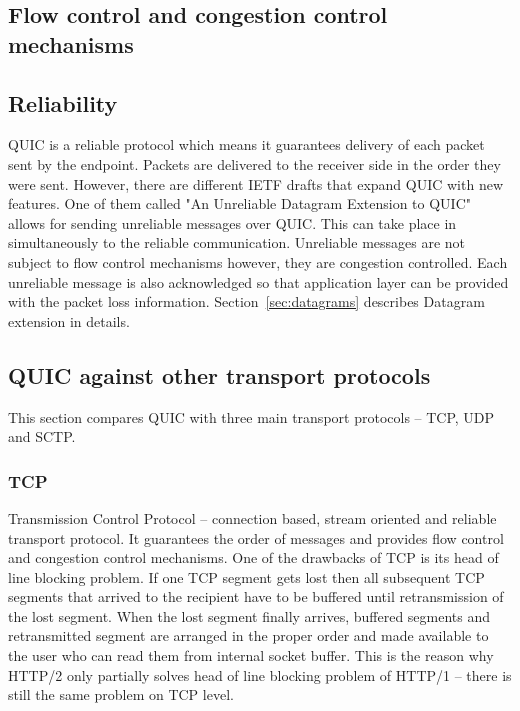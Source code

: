 \subsection{Flow control and congestion control mechanisms}
\label{subsec:flow-control-and-congestion-control}

\subsection{Reliability}
\label{subsec:reliability}
QUIC is a reliable protocol which means it guarantees delivery of each packet sent by the endpoint.
Packets are delivered to the receiver side in the order they were sent.
However, there are different IETF drafts that expand QUIC with new features.
One of them called "An Unreliable Datagram Extension to QUIC"\cite{bider-ssh-quic-09} allows for sending unreliable messages over QUIC\@.
This can take place in simultaneously to the reliable communication.
Unreliable messages are not subject to flow control mechanisms however, they are congestion controlled.
Each unreliable message is also acknowledged so that application layer can be provided with the packet loss information.
Section~\ref{sec:datagrams} describes Datagram extension in details.

\subsection{QUIC against other transport protocols}
\label{subsec:quic_against_other_transport_protocols}
This section compares QUIC with three main transport protocols -- TCP, UDP and SCTP\@.

\subsubsection{TCP}
Transmission Control Protocol -- connection based, stream oriented and reliable transport protocol.
It guarantees the order of messages and provides flow control and congestion control mechanisms.
One of the drawbacks of TCP is its head of line blocking problem.
If one TCP segment gets lost then all subsequent TCP segments that arrived to the recipient have to be buffered until retransmission of the lost segment.
When the lost segment finally arrives, buffered segments and retransmitted segment are arranged in the proper order and made available to the user who can read them from internal socket buffer.
This is the reason why HTTP/2 only partially solves head of line blocking problem of HTTP/1 -- there is still the same problem on TCP level.

